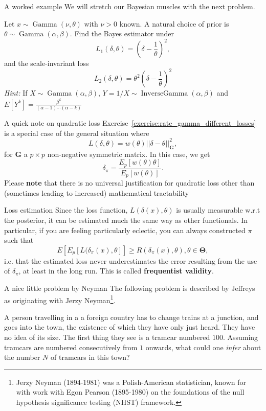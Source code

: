 \begin{frame}{A worked example}
We will stretch our Bayesian muscles with the next problem. 
\begin{exercise}
\label{exercise:rate_gamma_different_losses}
 Let $x \sim \operatorname{Gamma}(\nu, \theta)$ with $\nu >0$ known.
 A natural choice of prior is $\theta \sim \operatorname{Gamma}(\alpha, \beta)$.
 Find the Bayes estimator under 
 $$ L_1(\delta, \theta) = \left(\delta - \frac{1}{\theta}\right)^2, $$
 and the scale-invariant loss
 $$ L_2(\delta, \theta) = \theta^2 \left(\delta - \frac{1}{\theta}\right)^2$$
 \textit{Hint:} If $X \sim \operatorname{Gamma}(\alpha, \beta)$, $Y = 1/X \sim \operatorname{InverseGamma}(\alpha, \beta)$ and $E[Y^k] = \frac{\beta^k}{(\alpha-1)\cdots(\alpha-k)}$
\end{exercise}
\end{frame}
\begin{frame}{A quick note on quadratic loss}
 Exercise~\ref{exercise:rate_gamma_different_losses} is a special case of the general situation where 
 $$ L(\delta, \theta) = w(\theta) ||\delta-\theta||_{\boldsymbol{G}}^2, $$
 for $\boldsymbol{G}$ a $p \times p$ non-negative symmetric matrix.
 In this case, we get
 $$ \delta_\pi = \frac{E_p[w(\theta)\theta]}{E_p[w(\theta)]}. $$
 Please \textbf{note} that there is no universal justification for quadratic loss other than (sometimes leading to increased) mathematical tractability
\end{frame}
\begin{frame}{Loss estimation}
 Since the loss function, $L(\delta(x), \theta)$ is usually measurable w.r.t the posterior, it can be estimated much the same way as other functionals.
 In particular, if you are feeling particularly eclectic, you can always constructed $\pi$ such that
 $$ E\left[E_p[L(\delta_\pi(x), \theta]\right] \geq R(\delta_\pi(x), \theta),  \theta \in \boldsymbol{\Theta}, $$
 i.e. that the estimated loss never underestimates the error resulting from the use of $\delta_\pi$, at least in the long run.
 This is called \textbf{frequentist validity}.
 \end{frame}
\begin{frame}{A nice little problem by Neyman}
The following problem is described by Jeffreys as originating with Jerzy Neyman\footnote{Jerzy Neyman (1894-1981) was a Polish-American statistician, known for with work with Egon Pearson (1895-1980) on the foundations of the null hypothesis significance testing (NHST) framework.}.
\begin{exercise}
 \label{exercise:tramcar}
 A person travelling in a a foreign country has to change trains at a junction, and goes into the town, the existence of which they have only just heard.
 They have no idea of its size.
 The first thing they see is a tramcar numbered $100$.
 Assuming tramcars are numbered consecutively from $1$ onwards, what could one \textit{infer} about the number $N$ of tramcars in this town?
\end{exercise}
\end{frame}

